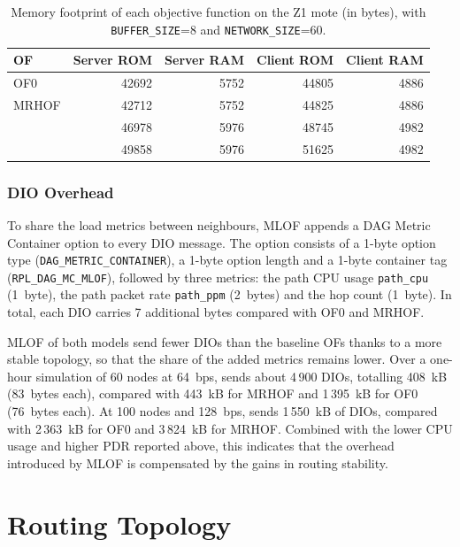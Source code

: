\begin{table}[h]
    \caption{Memory footprint of each objective function on the Z1 mote (in
    bytes), with \texttt{BUFFER\_SIZE}=8 and \texttt{NETWORK\_SIZE}=60.}
    \label{tab:memory-overhead}
    \begin{center}
        \begin{tabular}{lrrrr}
            \hline
            \textbf{OF} & \textbf{Server ROM} & \textbf{Server RAM} &
            \textbf{Client ROM} & \textbf{Client RAM} \\
            \hline
            OF0         & 42692 & 5752 & 44805 & 4886 \\
            MRHOF       & 42712 & 5752 & 44825 & 4886 \\
            \dtree{}  & 46978 & 5976 & 48745 & 4982 \\
            \lgbm{}   & 49858 & 5976 & 51625 & 4982 \\
            \hline
        \end{tabular}
    \end{center}
\end{table}

\subsubsection{DIO Overhead}
To share the load metrics between neighbours, MLOF appends a DAG
Metric Container option to every DIO message. The option consists of a
1-byte option type (\texttt{DAG\_METRIC\_CONTAINER}), a 1-byte option
length and a 1-byte container tag (\texttt{RPL\_DAG\_MC\_MLOF}),
followed by three metrics: the path CPU usage \texttt{path\_cpu}
(1~byte), the path packet rate \texttt{path\_ppm} (2~bytes) and the
hop count (1~byte). In total, each DIO carries 7 additional bytes
compared with OF0 and MRHOF.

MLOF of both models send fewer DIOs than the baseline OFs
thanks to a more stable topology, so that the share of the added
metrics remains lower. Over a one-hour simulation
of 60 nodes at 64~bps, \dtree{} sends about 4\,900 DIOs, totalling
408~kB (83~bytes each), compared with 443~kB for MRHOF and 1\,395~kB
for OF0 (76~bytes each).
At 100 nodes and 128~bps, \dtree{} sends 1\,550~kB of DIOs,
compared with 2\,363~kB for OF0 and 3\,824~kB for MRHOF. Combined
with the lower CPU usage and higher PDR reported above, this indicates
that the overhead introduced by MLOF is compensated by the
gains in routing stability.

\section{Routing Topology}
